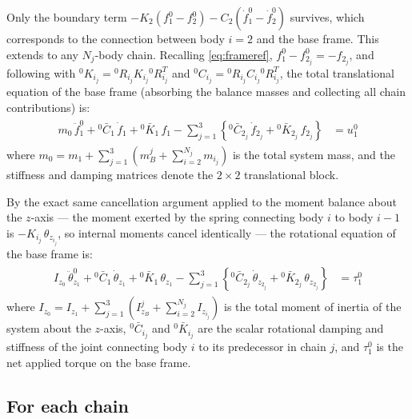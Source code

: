 \documentclass[11pt]{article}
\theoremstyle{definition}
\begin{document}
Only the boundary term $- K_2(f^0_1 - f^0_2) - C_2(\dot{f}^0_1 - \dot{f}^0_2)$ survives, which corresponds to the connection between body $i = 2$ and the base frame. This extends to any $N_j$-body chain. Recalling \eqref{eq:frameref}, $f^{0}_{1} - f^{0}_{2_j} = -f_{2_j}$, and following \cite{Al-Rawashdeh2022_Caracterization} with ${}^0K_{i_j}={}^0R_{i_j} K_{i_j} {}^0R^T_{i_j}$ and ${}^0C_{i_j}={}^0R_{i_j} C_{i_j} {}^0R^T_{i_j}$, the total translational equation of the base frame (absorbing the balance masses and collecting all chain contributions) is:
\begin{align} \label{eq:baseframeeq}
    \begin{split}
        m_0\,\ddot{f}^{0}_{1}
        + {}^0\bar{C}_1\,\dot{f}_1
        + {}^0\bar{K}_1\,f_1
        - \sum_{j=1}^{3}\left\{
            {}^0\bar{C}_{2_j}\,\dot{f}_{2_j} + {}^0\bar{K}_{2_j}\,f_{2_j}
        \right\}
        &= u^0_{1}
    \end{split}
\end{align}
where $m_0 = m_{1} + \sum_{j=1}^{3}\!\left(m^j_{B} + \sum_{i=2}^{N_j} m_{i_j}\right)$ is the total system mass, and the stiffness and damping matrices denote the $2\times2$ translational block.

By the exact same cancellation argument applied to the moment balance about the $z$-axis — the moment exerted by the spring connecting body $i$ to body $i-1$ is $-K_{i_j}\,\theta_{z_{i_j}}$, so internal moments cancel identically — the rotational equation of the base frame is:
\begin{align} \label{eq:baseframerot}
    \begin{split}
        I_{z_0}\,\ddot{\theta}^{0}_{z_1}
        + {}^0\bar{C}_1\,\dot{\theta}_{z_1}
        + {}^0\bar{K}_1\,\theta_{z_1}
        - \sum_{j=1}^{3}\left\{
            {}^0\bar{C}_{2_j}\,\dot{\theta}_{z_{2_j}}
            + {}^0\bar{K}_{2_j}\,\theta_{z_{2_j}}
        \right\}
        &= \tau^0_{1}
    \end{split}
\end{align}
where $I_{z_0} = I_{z_1} + \sum_{j=1}^{3}\!\left(I^j_{z_B} + \sum_{i=2}^{N_j} I_{z_{i_j}}\right)$ is the total moment of inertia of the system about the $z$-axis, ${}^0\bar{C}_{i_j}$ and ${}^0\bar{K}_{i_j}$ are the scalar rotational damping and stiffness of the joint connecting body $i$ to its predecessor in chain $j$, and $\tau^0_1$ is the net applied torque on the base frame.

\subsection{For each chain}
\end{document}
